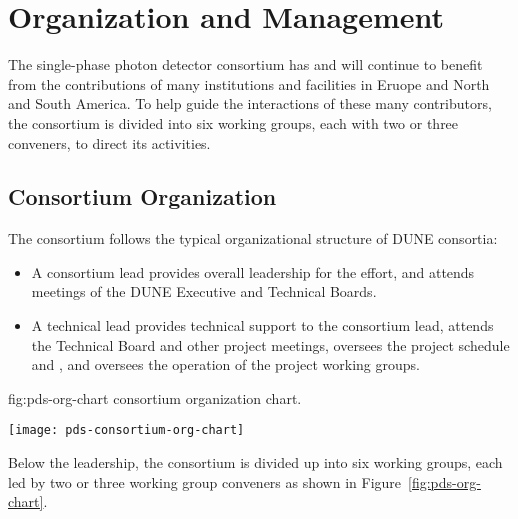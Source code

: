 \section{Organization and Management}
\label{sec:fdsp-pd-org}

The single-phase photon detector consortium has and will continue to benefit from the contributions of many institutions and facilities in Eruope and North and South America.  To help guide the interactions of these many contributors, the consortium is divided into six working groups, each with two or three conveners, to direct its activities.  %

\subsection{Consortium Organization}
\label{sec:fdsp-pd-org-consortium}

The \single {} consortium follows the typical organizational structure of DUNE consortia:
\begin{itemize}
\item A consortium lead
provides overall leadership for the effort, and attends meetings of the DUNE Executive and Technical Boards.
\item A technical lead 
provides technical support to the consortium lead, attends the Technical Board and other project meetings, oversees the project schedule and , and oversees the operation of the project working groups.  
\end{itemize}

\begin{dunefigure}{fig:pds-org-chart}
{ consortium organization chart.}

	\texttt{[image: pds-consortium-org-chart]}
	
\end{dunefigure} 



Below the leadership, the consortium is divided up into six working groups, each led by two or three working group conveners as shown in Figure~\ref{fig:pds-org-chart}. 



